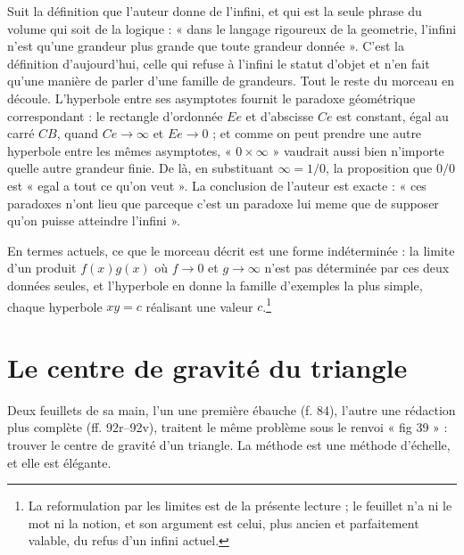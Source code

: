 \documentclass[11pt,a4paper]{article}
\begin{document}
Suit la définition que l'auteur donne de l'infini, et qui est la seule phrase
du volume qui soit de la logique : « dans le langage rigoureux de la
geometrie, l'infini n'est qu'une grandeur plus grande que toute grandeur
donnée ». C'est la définition d'aujourd'hui, celle qui refuse à l'infini le
statut d'objet et n'en fait qu'une manière de parler d'une famille de
grandeurs. Tout le reste du morceau en découle. L'hyperbole entre ses
asymptotes fournit le paradoxe géométrique correspondant : le rectangle
d'ordonnée $Ee$ et d'abscisse $Ce$ est constant, égal au carré $CB$, quand
$Ce \to \infty$ et $Ee \to 0$ ; et comme on peut prendre une autre hyperbole
entre les mêmes asymptotes, « $0 \times \infty$ » vaudrait aussi bien n'importe
quelle autre grandeur finie. De là, en substituant $\infty = 1/0$, la
proposition que $0/0$ est « egal a tout ce qu'on veut ». La conclusion de
l'auteur est exacte : « ces paradoxes n'ont lieu que parceque c'est un
paradoxe lui meme que de supposer qu'on puisse atteindre l'infini ».

En termes actuels, ce que le morceau décrit est une forme indéterminée : la
limite d'un produit $f(x)g(x)$ où $f \to 0$ et $g \to \infty$ n'est pas
déterminée par ces deux données seules, et l'hyperbole en donne la famille
d'exemples la plus simple, chaque hyperbole $xy = c$ réalisant une valeur
$c$.\footnote{La reformulation par les limites est de la présente lecture ; le
feuillet n'a ni le mot ni la notion, et son argument est celui, plus ancien et
parfaitement valable, du refus d'un infini actuel.}

\section*{Le centre de gravité du triangle}

Deux feuillets de sa main, l'un une première ébauche (f. 84), l'autre une
rédaction plus complète (ff. 92r–92v), traitent le même problème sous le
renvoi « fig 39 » : trouver le centre de gravité d'un triangle. La méthode est
une méthode d'échelle, et elle est élégante.
\end{document}
